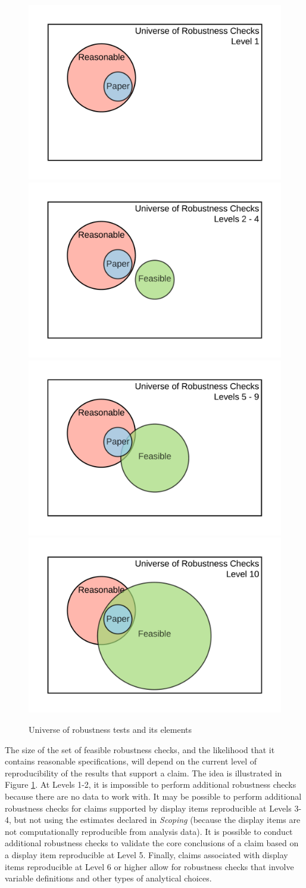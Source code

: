 \documentclass[
]{book}
\begin{document}
\begin{figure}
\includegraphics[width=0.5\linewidth]{robustness_lvl1} \includegraphics[width=0.5\linewidth]{robustness_lvl2_4} \includegraphics[width=0.5\linewidth]{robustness_lvl5-9} \includegraphics[width=0.5\linewidth]{robustness_lvl10} \caption{Universe of robustness tests and its elements}\label{fig:robusts}
\end{figure}

The size of the set of feasible robustness checks, and the likelihood that it contains reasonable specifications, will depend on the current level of reproducibility of the results that support a claim. The idea is illustrated in Figure \ref{fig:robusts}. At Levels 1-2, it is impossible to perform additional robustness checks because there are no data to work with. It may be possible to perform additional robustness checks for claims supported by display items reproducible at Levels 3-4, but not using the estimates declared in \emph{Scoping} (because the display items are not computationally reproducible from analysis data). It is possible to conduct additional robustness checks to validate the core conclusions of a claim based on a display item reproducible at Level 5. Finally, claims associated with display items reproducible at Level 6 or higher allow for robustness checks that involve variable definitions and other types of analytical choices.
\end{document}
